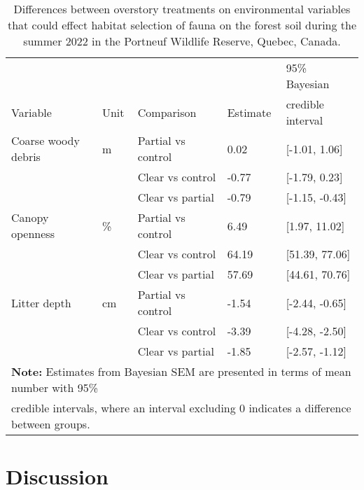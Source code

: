 \begin{table}[ht]
  \centering
  \caption[Differences between overstory treatments on environmental variables that could effect habitat selection of fauna on the forest soil.]
  {Differences between overstory treatments on environmental variables that could effect habitat selection of fauna on the forest soil during the summer 2022 in the Portneuf Wildlife Reserve,
  Quebec, Canada.}
  \label{tab:overstoryenvar}
  \begin{tabular}{lllll} 
      \hline
      &&&&95\% Bayesian \\
      Variable&Unit& Comparison & Estimate &  credible interval \\ [0.5ex] 
      \hline
      Coarse woody debris &m\up{3}& Partial vs control & \hspace{1mm}0.02 & [-1.01, 1.06] \\ 
                 && Clear vs control  & -0.77 & [-1.79, 0.23] \\ 
                          && Clear vs partial  & -0.79 & [-1.15, -0.43] \\
      Canopy openness     &\%& Partial vs control & \hspace{1mm}6.49 & [1.97, 11.02] \\ 
                      && Clear vs control  & \hspace{1mm}64.19 & [51.39, 77.06] \\ 
                          && Clear vs partial  & \hspace{1mm}57.69 & [44.61, 70.76] \\ 
      Litter depth        &cm& Partial vs control & -1.54 & [-2.44, -0.65] \\ 
                      && Clear vs control  & -3.39 & [-4.28, -2.50] \\ 
                          && Clear vs partial  & -1.85 & [-2.57, -1.12] \\       
      \hline
      \multicolumn{5}{l}{\textbf{Note:} Estimates from Bayesian SEM are presented in terms of mean number with 95\%} \\
      \multicolumn{5}{l}{credible intervals, where an interval excluding 0 indicates a difference between groups.} \\
  \end{tabular}
\end{table}




\clearpage

\section*{Discussion}
\label{sec:discu1}

